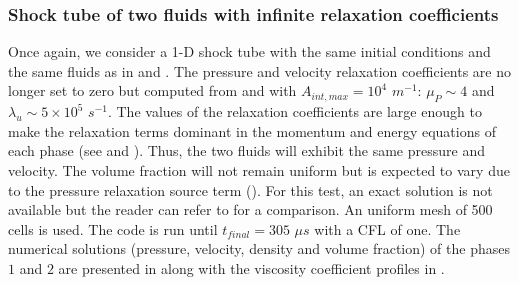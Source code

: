 \documentclass[preprint,10pt]{elsarticle}
\begin{document}
\subsubsection{Shock tube of two fluids with infinite relaxation coefficients}\label{sec:shock-tube-infinite-rel-coeff}
%
Once again, we consider a 1-D shock tube with the same initial conditions and the same fluids as in  and . 
The pressure and velocity relaxation coefficients are no longer set to zero but computed from  and  with $A_{int,max} =  
10^4$ $m^{-1}$: $\mu_P \sim 4$ and $\lambda_u \sim 5 \times 10^5$ $s^{-1}$. The values of the relaxation coefficients are large enough to make the 
relaxation terms dominant in the momentum and energy equations of each phase (see  and ). Thus, the two fluids will exhibit the 
same pressure and velocity. The volume fraction will not remain uniform but is expected to vary due to the pressure relaxation source term (). For 
this test, an exact solution is not available but the reader can refer to \cite{Saurel_2007} for a comparison. An uniform mesh of 500 cells is used. The code is 
run until $t_{final} = 305$ $\mu s$ with a CFL of one. The numerical solutions (pressure, velocity, density and volume fraction) of the phases $1$ and $2$ are presented in  along with the viscosity coefficient profiles in .
%
\end{document}
